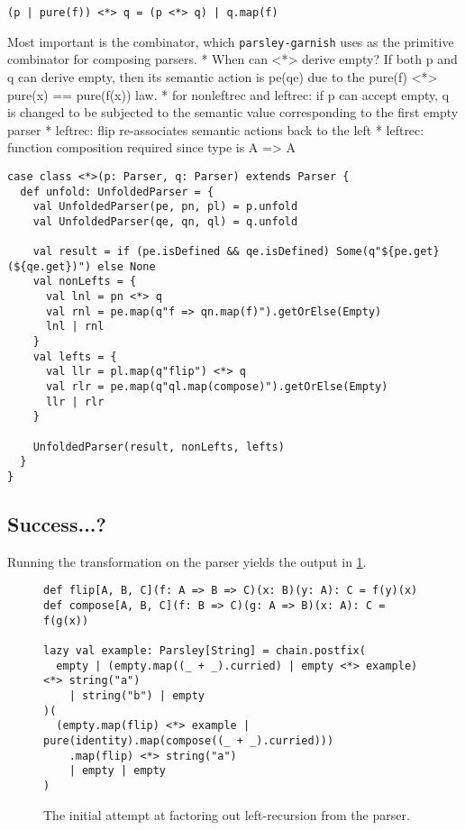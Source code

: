 \documentclass[../../main.tex]{subfiles}
\begin{document}
\begin{verbatim}
(p | pure(f)) <*> q = (p <*> q) | q.map(f)
\end{verbatim}
Most important is the \scala{<*>} combinator, which \texttt{parsley-garnish} uses as the primitive combinator for composing parsers.
* When can <*> derive empty? If both p and q can derive empty, then its semantic action is pe(qe) due to the pure(f) <*> pure(x) == pure(f(x)) law.
* for nonleftrec and leftrec: if p can accept empty, q is changed to be subjected to the semantic value corresponding to the first empty parser
  * leftrec: flip re-associates semantic actions back to the left
  * leftrec: function composition required since type is A => A
%
\begin{verbatim}
case class <*>(p: Parser, q: Parser) extends Parser {
  def unfold: UnfoldedParser = {
    val UnfoldedParser(pe, pn, pl) = p.unfold
    val UnfoldedParser(qe, qn, ql) = q.unfold

    val result = if (pe.isDefined && qe.isDefined) Some(q"${pe.get}(${qe.get})") else None
    val nonLefts = {
      val lnl = pn <*> q
      val rnl = pe.map(q"f => qn.map(f)").getOrElse(Empty)
      lnl | rnl
    }
    val lefts = {
      val llr = pl.map(q"flip") <*> q
      val rlr = pe.map(q"ql.map(compose)").getOrElse(Empty)
      llr | rlr
    }

    UnfoldedParser(result, nonLefts, lefts)
  }
}
\end{verbatim}

\subsection{Success...?}
Running the transformation on the  parser yields the output in \cref{fig:leftrec-example-bad}.
%
\begin{figure}[htbp]
\begin{verbatim}
def flip[A, B, C](f: A => B => C)(x: B)(y: A): C = f(y)(x)
def compose[A, B, C](f: B => C)(g: A => B)(x: A): C = f(g(x))

lazy val example: Parsley[String] = chain.postfix(
  empty | (empty.map((_ + _).curried) | empty <*> example) <*> string("a")
    | string("b") | empty
)(
  (empty.map(flip) <*> example | pure(identity).map(compose((_ + _).curried)))
    .map(flip) <*> string("a")
    | empty | empty
)
\end{verbatim}
\caption{The initial attempt at factoring out left-recursion from the  parser.}
\label{fig:leftrec-example-bad}
\end{figure}
\end{document}

